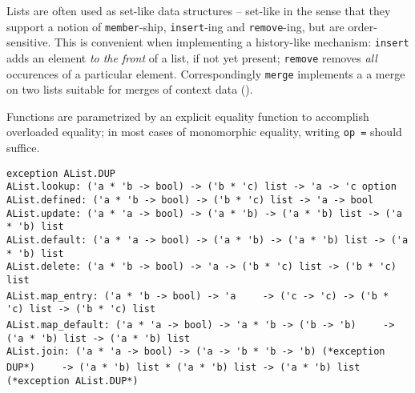 \begin{isabellebody}
\begin{isamarkuptext}
\begin{mldecls}
  \end{mldecls}%
\end{isamarkuptext}%
\isamarkuptrue%
%
\begin{isamarkuptext}%
Lists are often used as set-like data structures -- set-like in
  the sense that they support a notion of \verb|member|-ship,
  \verb|insert|-ing and \verb|remove|-ing, but are order-sensitive.
  This is convenient when implementing a history-like mechanism:
  \verb|insert| adds an element \emph{to the front} of a list,
  if not yet present; \verb|remove| removes \emph{all} occurences
  of a particular element.  Correspondingly \verb|merge| implements a 
  a merge on two lists suitable for merges of context data
  ().

  Functions are parametrized by an explicit equality function
  to accomplish overloaded equality;  in most cases of monomorphic
  equality, writing \verb|op =| should suffice.%
\end{isamarkuptext}%
\isamarkuptrue%
%
\isamarkuptrue%
%
\begin{isamarkuptext}%
\begin{mldecls}
  \verb|exception AList.DUP| \\
  \verb|AList.lookup: ('a * 'b -> bool) -> ('b * 'c) list -> 'a -> 'c option| \\
  \verb|AList.defined: ('a * 'b -> bool) -> ('b * 'c) list -> 'a -> bool| \\
  \verb|AList.update: ('a * 'a -> bool) -> ('a * 'b) -> ('a * 'b) list -> ('a * 'b) list| \\
  \verb|AList.default: ('a * 'a -> bool) -> ('a * 'b) -> ('a * 'b) list -> ('a * 'b) list| \\
  \verb|AList.delete: ('a * 'b -> bool) -> 'a -> ('b * 'c) list -> ('b * 'c) list| \\
  \verb|AList.map_entry: ('a * 'b -> bool) -> 'a|\isasep\isanewline%
\verb|    -> ('c -> 'c) -> ('b * 'c) list -> ('b * 'c) list| \\
  \verb|AList.map_default: ('a * 'a -> bool) -> 'a * 'b -> ('b -> 'b)|\isasep\isanewline%
\verb|    -> ('a * 'b) list -> ('a * 'b) list| \\
  \verb|AList.join: ('a * 'a -> bool) -> ('a -> 'b * 'b -> 'b) (*exception DUP*)|\isasep\isanewline%
\verb|    -> ('a * 'b) list * ('a * 'b) list -> ('a * 'b) list (*exception AList.DUP*)| \\

\end{mldecls}
\end{isamarkuptext}
\end{isabellebody}
